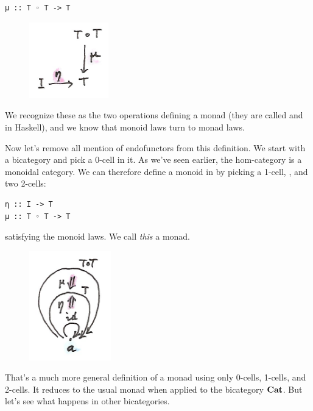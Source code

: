 \begin{Verbatim}[commandchars=\\\{\}]
μ :: T ◦ T -> T
\end{Verbatim}

\begin{figure}[H]
\centering
\includegraphics[width=1.35417in]{images/monad.png}
\end{figure}

\noindent
We recognize these as the two operations defining a monad (they are
called  and  in Haskell), and we know that
monoid laws turn to monad laws.

Now let's remove all mention of endofunctors from this definition. We
start with a bicategory  and pick a 0-cell  in it.
As we've seen earlier, the hom-category  is a monoidal
category. We can therefore define a monoid in  by
picking a 1-cell, , and two 2-cells:

\begin{Verbatim}[commandchars=\\\{\}]
η :: I -> T
μ :: T ◦ T -> T
\end{Verbatim}
satisfying the monoid laws. We call \emph{this} a monad.

\begin{figure}[H]
\centering
\includegraphics[width=1.39583in]{images/bimonad.png}
\end{figure}

\noindent
That's a much more general definition of a monad using only 0-cells,
1-cells, and 2-cells. It reduces to the usual monad when applied to the
bicategory $\mathbf{Cat}$. But let's see what happens in other
bicategories.

